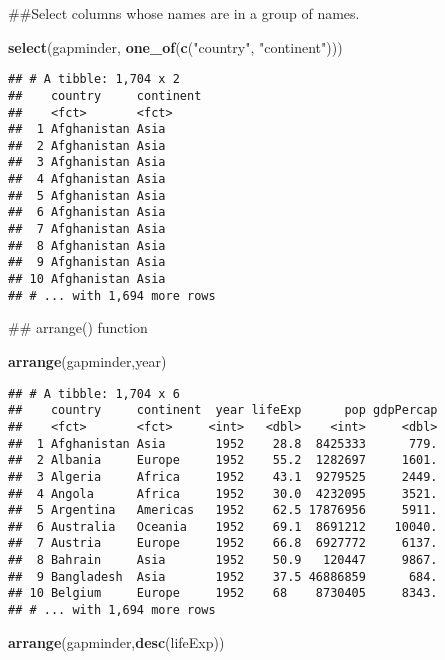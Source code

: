 \documentclass[]{article}
\newenvironment{Shaded}{\begin{snugshade}}{\end{snugshade}}
\newcommand{\KeywordTok}[1]{\textcolor[rgb]{0.13,0.29,0.53}{\textbf{#1}}}
\newcommand{\NormalTok}[1]{#1}
\newcommand{\StringTok}[1]{\textcolor[rgb]{0.31,0.60,0.02}{#1}}
\begin{document}
\begin{Shaded}
\begin{Highlighting}[]
\NormalTok{##Select columns whose names are in a group of names. }

\KeywordTok{select}\NormalTok{(gapminder, }\KeywordTok{one_of}\NormalTok{(}\KeywordTok{c}\NormalTok{(}\StringTok{"country"}\NormalTok{, }\StringTok{"continent"}\NormalTok{)))}
\end{Highlighting}
\end{Shaded}

\begin{verbatim}
## # A tibble: 1,704 x 2
##    country     continent
##    <fct>       <fct>    
##  1 Afghanistan Asia     
##  2 Afghanistan Asia     
##  3 Afghanistan Asia     
##  4 Afghanistan Asia     
##  5 Afghanistan Asia     
##  6 Afghanistan Asia     
##  7 Afghanistan Asia     
##  8 Afghanistan Asia     
##  9 Afghanistan Asia     
## 10 Afghanistan Asia     
## # ... with 1,694 more rows
\end{verbatim}

\begin{Shaded}
\begin{Highlighting}[]
\NormalTok{## arrange() function}

\KeywordTok{arrange}\NormalTok{(gapminder,year)}
\end{Highlighting}
\end{Shaded}

\begin{verbatim}
## # A tibble: 1,704 x 6
##    country     continent  year lifeExp      pop gdpPercap
##    <fct>       <fct>     <int>   <dbl>    <int>     <dbl>
##  1 Afghanistan Asia       1952    28.8  8425333      779.
##  2 Albania     Europe     1952    55.2  1282697     1601.
##  3 Algeria     Africa     1952    43.1  9279525     2449.
##  4 Angola      Africa     1952    30.0  4232095     3521.
##  5 Argentina   Americas   1952    62.5 17876956     5911.
##  6 Australia   Oceania    1952    69.1  8691212    10040.
##  7 Austria     Europe     1952    66.8  6927772     6137.
##  8 Bahrain     Asia       1952    50.9   120447     9867.
##  9 Bangladesh  Asia       1952    37.5 46886859      684.
## 10 Belgium     Europe     1952    68    8730405     8343.
## # ... with 1,694 more rows
\end{verbatim}

\begin{Shaded}
\begin{Highlighting}[]
\KeywordTok{arrange}\NormalTok{(gapminder,}\KeywordTok{desc}\NormalTok{(lifeExp))}
\end{Highlighting}
\end{Shaded}
\end{document}
